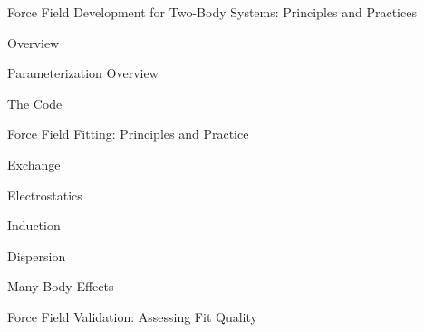 
\begin{chapter}{Force Field Development for Two-Body Systems: Principles and
Practices}
\label{ch:pointer}

\newcommand{\vmultipolecolor}{\ensuremath{\sum\limits_{\textcolor{mon}{tu}}\textcolor{mon}{Q_t^i}T_{tu}\textcolor{mon}{Q_u^j}}\xspace}

\begin{section}{Overview}

\end{section}



\begin{section}{Parameterization Overview}

\end{section}

\begin{section}{The \pointer Code}

\end{section}

\begin{section}{Force Field Fitting: Principles and Practice}
\label{sec:pointer-fitting}

\begin{subsection}{Exchange}
\label{sec:pointer-exchange}

\end{subsection}
\begin{subsection}{Electrostatics}
\label{sec:pointer-electrostatics}

\end{subsection}
\begin{subsection}{Induction}
\label{sec:pointer-induction}

\end{subsection}
\begin{subsection}{Dispersion}
\label{sec:pointer-dispersion}

\end{subsection}
\begin{subsection}{Many-Body Effects}

\end{subsection}
\end{section}

\begin{section}{Force Field Validation: Assessing Fit Quality}
\label{sec:pointer-validate}

\end{section}


\end{chapter}
